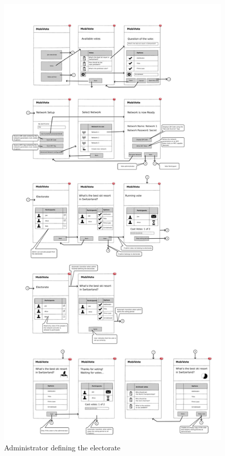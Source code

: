 \documentclass[numbers=noenddot, abstract=on, a4paper, headsepline,
footsepline, oneside, draft=off]{scrreprt}
\begin{document}
\begin{figure}[htb]
	\centering
	\includegraphics[height=.4\textheight]{img/storyboard/admin_review}
	\caption{Administrator defining the electorate}
	\label{fig:admin_review}
\end{figure}
\end{document}
